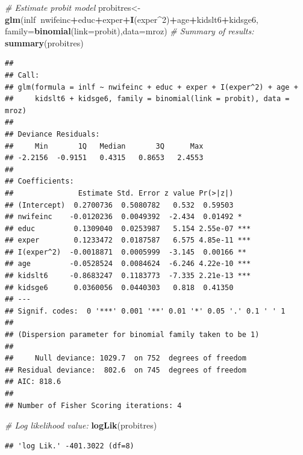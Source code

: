 \documentclass[]{book}
\newenvironment{Shaded}{\begin{snugshade}}{\end{snugshade}}
\newcommand{\CommentTok}[1]{\textcolor[rgb]{0.56,0.35,0.01}{\textit{#1}}}
\newcommand{\DataTypeTok}[1]{\textcolor[rgb]{0.13,0.29,0.53}{#1}}
\newcommand{\DecValTok}[1]{\textcolor[rgb]{0.00,0.00,0.81}{#1}}
\newcommand{\KeywordTok}[1]{\textcolor[rgb]{0.13,0.29,0.53}{\textbf{#1}}}
\newcommand{\NormalTok}[1]{#1}
\newcommand{\OperatorTok}[1]{\textcolor[rgb]{0.81,0.36,0.00}{\textbf{#1}}}
\begin{document}
\begin{Shaded}
\begin{Highlighting}[]
\CommentTok{# Estimate probit model}
\NormalTok{probitres<-}\KeywordTok{glm}\NormalTok{(inlf}\OperatorTok{~}\NormalTok{nwifeinc}\OperatorTok{+}\NormalTok{educ}\OperatorTok{+}\NormalTok{exper}\OperatorTok{+}\KeywordTok{I}\NormalTok{(exper}\OperatorTok{^}\DecValTok{2}\NormalTok{)}\OperatorTok{+}\NormalTok{age}\OperatorTok{+}\NormalTok{kidslt6}\OperatorTok{+}\NormalTok{kidsge6,}
               \DataTypeTok{family=}\KeywordTok{binomial}\NormalTok{(}\DataTypeTok{link=}\NormalTok{probit),}\DataTypeTok{data=}\NormalTok{mroz)}
\CommentTok{# Summary of results:}
\KeywordTok{summary}\NormalTok{(probitres)}
\end{Highlighting}
\end{Shaded}

\begin{verbatim}
## 
## Call:
## glm(formula = inlf ~ nwifeinc + educ + exper + I(exper^2) + age + 
##     kidslt6 + kidsge6, family = binomial(link = probit), data = mroz)
## 
## Deviance Residuals: 
##     Min       1Q   Median       3Q      Max  
## -2.2156  -0.9151   0.4315   0.8653   2.4553  
## 
## Coefficients:
##               Estimate Std. Error z value Pr(>|z|)    
## (Intercept)  0.2700736  0.5080782   0.532  0.59503    
## nwifeinc    -0.0120236  0.0049392  -2.434  0.01492 *  
## educ         0.1309040  0.0253987   5.154 2.55e-07 ***
## exper        0.1233472  0.0187587   6.575 4.85e-11 ***
## I(exper^2)  -0.0018871  0.0005999  -3.145  0.00166 ** 
## age         -0.0528524  0.0084624  -6.246 4.22e-10 ***
## kidslt6     -0.8683247  0.1183773  -7.335 2.21e-13 ***
## kidsge6      0.0360056  0.0440303   0.818  0.41350    
## ---
## Signif. codes:  0 '***' 0.001 '**' 0.01 '*' 0.05 '.' 0.1 ' ' 1
## 
## (Dispersion parameter for binomial family taken to be 1)
## 
##     Null deviance: 1029.7  on 752  degrees of freedom
## Residual deviance:  802.6  on 745  degrees of freedom
## AIC: 818.6
## 
## Number of Fisher Scoring iterations: 4
\end{verbatim}

\begin{Shaded}
\begin{Highlighting}[]
\CommentTok{# Log likelihood value:}
\KeywordTok{logLik}\NormalTok{(probitres) }
\end{Highlighting}
\end{Shaded}

\begin{verbatim}
## 'log Lik.' -401.3022 (df=8)
\end{verbatim}
\end{document}
